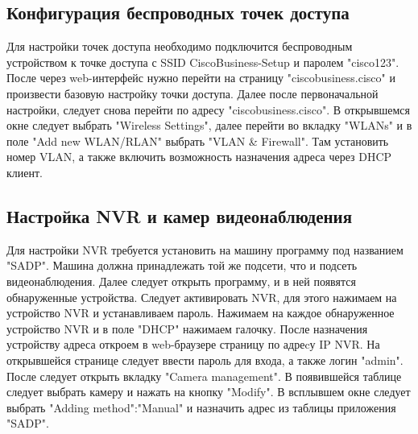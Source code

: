 \subsection{Конфигурация беспроводных точек доступа}
Для настройки точек доступа необходимо подключится беспроводным устройством к точке доступа с SSID CiscoBusiness-Setup
и паролем "cisco123". После через web-интерфейс нужно перейти на страницу "ciscobusiness.cisco" и произвести базовую настройку
точки доступа. Далее после первоначальной настройки, следует снова перейти по адресу "ciscobusiness.cisco". В открывшемся окне
следует выбрать "Wireless Settings", далее перейти во вкладку "WLANs" и в поле "Add new WLAN/RLAN" выбрать "VLAN \& Firewall".
Там установить номер VLAN, а также включить возможность назначения адреса через DHCP клиент.

\subsection{Настройка NVR и камер видеонаблюдения}
Для настройки NVR требуется установить на машину программу под названием "SADP". Машина должна принадлежать той же подсети, что и подсеть видеонаблюдения.
Далее следует открыть программу, и в ней появятся обнаруженные устройства. Следует активировать NVR, для этого нажимаем на
устройство NVR и устанавливаем пароль. Нажимаем на каждое обнаруженное устройство  NVR и в поле "DHCP" нажимаем галочку.
После назначения устройству адреса откроем в web-браузере страницу по адреcу IP NVR. На открывшейся странице следует ввести пароль для входа, 
а также логин "admin". После следует открыть вкладку "Camera management". В появившейся таблице следует выбрать камеру и нажать на кнопку "Modify".
В всплывшем окне следует выбрать "Adding method":"Manual" и назначить адрес из таблицы приложения "SADP".
